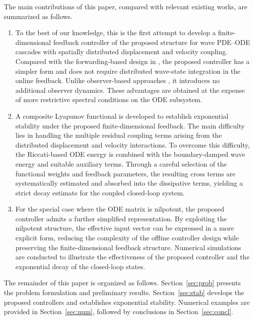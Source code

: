 \documentclass{IEEEtran}
\theoremstyle{definition}
\begin{document}
The main contributions of this paper, compared with relevant existing works, are summarized as follows.
\begin{enumerate}
\item To the best of our knowledge, this is the first attempt to develop a finite-dimensional feedback controller of the proposed structure for wave PDE--ODE cascades with spatially distributed displacement and velocity coupling. Compared with the forwarding-based design in \cite{tsubakino_forwarding-based_2024}, the proposed controller has a simpler form and does not require distributed wave-state integration in the online feedback. Unlike observer-based approaches \cite{than_output-feedback_2021,mei_infinite-dimensional_2023,feng_output-feedback_2024}, it introduces no additional observer dynamics. These advantages are obtained at the expense of more restrictive spectral conditions on the ODE subsystem.

\item A composite Lyapunov functional is developed to establish exponential stability under the proposed finite-dimensional feedback. The main difficulty lies in handling the multiple residual coupling terms arising from the distributed displacement and velocity interactions. To overcome this difficulty, the Riccati-based ODE energy is combined with the boundary-damped wave energy and suitable auxiliary terms. Through a careful selection of the functional weights and feedback parameters, the resulting cross terms are systematically estimated and absorbed into the dissipative terms, yielding a strict decay estimate for the coupled closed-loop system.

\item For the special case where the ODE matrix is nilpotent, the proposed controller admits a further simplified representation. By exploiting the nilpotent structure, the effective input vector can be expressed in a more explicit form, reducing the complexity of the offline controller design while preserving the finite-dimensional feedback structure. Numerical simulations are conducted to illustrate the effectiveness of the proposed controller and the exponential decay of the closed-loop states.
\end{enumerate}

The remainder of this paper is organized as follows. Section~\ref{sec:prob} presents the problem formulation and preliminary results. Section~\ref{sec:stab} develops the proposed controllers and establishes exponential stability. Numerical examples are provided in Section~\ref{sec:num}, followed by conclusions in Section~\ref{sec:concl}.
\end{document}
